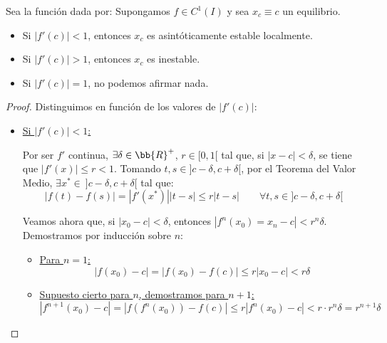 \begin{prop}
    Sea la función dada por:
    Supongamos $f \in C^1 (I)$ y sea $x_c \equiv c$ un equilibrio.

    \begin{itemize}
        \item Si $|f'(c)| < 1$, entonces $x_c$ es asintóticamente estable localmente.
        \item Si $|f'(c)| > 1$, entonces $x_c$ es inestable.
        \item Si $|f'(c)| = 1$, no podemos afirmar nada.
    \end{itemize}
\end{prop}
\begin{proof}
    Distinguimos en función de los valores de $|f'(c)|$:
    \begin{itemize}
        \item \ul{Si $|f'(c)|<1$:}

        Por ser $f'$ continua, $\exists \delta\in \bb{R}^+$, $r\in [0,1[$ tal que, si $|x-c|<\delta$, se tiene que $|f'(x)|\leq r<1$. Tomando $t,s\in ]c-\delta, c+\delta[$, por el Teorema del Valor Medio, $\exists x^\ast \in~]c-\delta, c+\delta[$ tal que:
        \begin{equation*}
            |f(t)-f(s)| = |f'(x^\ast)||t-s| \leq r|t-s| \qquad \forall t,s\in ]c-\delta, c+\delta[
        \end{equation*}

        Veamos ahora que, si $|x_0-c|<\delta$, entonces $|f^n(x_0)=x_n -c|<r^n  \delta$. Demostramos por inducción sobre $n$:
        \begin{itemize}
            \item \ul{Para $n=1$:}
            \begin{equation*}
                |f(x_0) - c| = |f(x_0)-f(c)|\leq r|x_0-c|< r\delta
            \end{equation*}

            \item \ul{Supuesto cierto para $n$, demostramos para $n+1$:}
            \begin{equation*}
                |f^{n+1}(x_0) - c| = |f(f^n(x_0))-f(c)|\leq r|f^n(x_0)-c|<r\cdot r^n \delta = r^{n+1}\delta
            \end{equation*}
        \end{itemize}


\end{itemize}
\end{proof}
